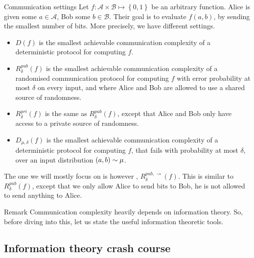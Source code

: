 \documentclass[a4paper]{article}
\begin{document}
\begin{parag}{Communication settings}
    Let $f: \mathcal{A} \times \mathcal{B} \mapsto \left\{0, 1\right\}$ be an arbitrary function. Alice is given some $a \in \mathcal{A}$, Bob some $b \in \mathcal{B}$. Their goal is to evaluate $f\left(a, b\right)$, by sending the smallest number of bits. More precisely, we have different settings.
    \begin{itemize}[left=0pt]
        \item $D\left(f\right)$ is the smallest achievable communication complexity of a deterministic protocol for computing $f$.
        \item $R_{\delta}^{pub}\left(f\right)$ is the smallest achievable communication complexity of a randomised communication protocol for computing $f$ with error probability at most $\delta$ on every input, and where Alice and Bob are allowed to use a shared source of randomness.
        \item $R_{\delta}^{pri}\left(f\right)$ is the same as $R_{\delta}^{pub}\left(f\right)$, except that Alice and Bob only have access to a private source of randomness.
        \item $D_{\mu, \delta}\left(f\right)$ is the smallest achievable communication complexity of a deterministic protocol for computing $f$, that fails with probability at most $\delta$, over an input distribution $\left(a, b\right) \followsdistr \mu$.
    \end{itemize}
    
    The one we will mostly focus on is however , $R_{\delta}^{pub, \to}\left(f\right)$. This is similar to $R_{\delta}^{pub}\left(f\right)$, except that we only allow Alice to send bits to Bob, he is not allowed to send anything to Alice.
\end{parag}
 

\begin{parag}{Remark}
    Communication complexity heavily depends on information theory. So, before diving into this, let us state the useful information theoretic tools.
\end{parag}

\subsection{Information theory crash course}
\end{document}
